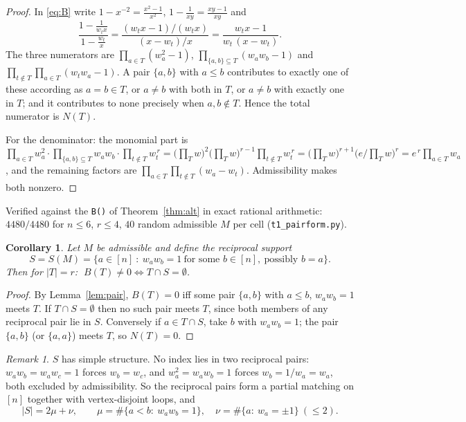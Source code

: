 \documentclass[11pt]{article}
\newtheorem{corollary}[theorem]{Corollary}
\theoremstyle{definition}
\theoremstyle{remark}
\newtheorem{remark}[theorem]{Remark}
\begin{document}
\begin{proof}
In \eqref{eq:B} write $1-x^{-2}=\frac{x^2-1}{x^2}$,
$1-\frac{1}{xy}=\frac{xy-1}{xy}$ and
\[
  \frac{1-\frac{1}{w_tx}}{1-\frac{w_t}{x}}
  =\frac{(w_tx-1)/(w_tx)}{(x-w_t)/x}
  =\frac{w_tx-1}{w_t\,(x-w_t)} .
\]
The three numerators are $\prod_{a\in T}(w_a^2-1)$, $\prod_{\{a,b\}\subseteq T}(w_aw_b-1)$
and $\prod_{t\notin T}\prod_{a\in T}(w_tw_a-1)$. A pair $\{a,b\}$ with $a\le b$
contributes to exactly one of these according as $a=b\in T$, or $a\ne b$ with both
in $T$, or $a\ne b$ with exactly one in $T$; and it contributes to none precisely
when $a,b\notin T$. Hence the total numerator is $N(T)$.

For the denominator: the monomial part is
$\prod_{a\in T}w_a^2\cdot\prod_{\{a,b\}\subseteq T}w_aw_b\cdot
 \prod_{t\notin T}w_t^{\,r}
 =\bigl(\prod_Tw\bigr)^{2}\bigl(\prod_Tw\bigr)^{r-1}\prod_{t\notin T}w_t^{\,r}
 =\bigl(\prod_Tw\bigr)^{r+1}\bigl(e/\!\prod_Tw\bigr)^{r}
 =e^{\,r}\prod_{a\in T}w_a$,
and the remaining factors are $\prod_{a\in T}\prod_{t\notin T}(w_a-w_t)$.
Admissibility makes both nonzero.
\end{proof}

Verified against the \texttt{B()} of Theorem~\ref{thm:alt} in exact rational
arithmetic: $4480/4480$ for $n\le6$, $r\le4$, $40$ random admissible $M$ per cell
(\texttt{t1\_pairform.py}).

\begin{corollary}\label{cor:Bzero}
Let $M$ be admissible and define the \emph{reciprocal support}
\[
  S=S(M)=\{a\in[n]\ :\ w_aw_b=1\ \text{for some }b\in[n],\ \text{possibly }b=a\}.
\]
Then for $|T|=r$: $\;B(T)\ne0\iff T\cap S=\emptyset$.
\end{corollary}

\begin{proof}
By Lemma~\ref{lem:pair}, $B(T)=0$ iff some pair $\{a,b\}$ with $a\le b$,
$w_aw_b=1$ meets $T$. If $T\cap S=\emptyset$ then no such pair meets $T$, since
both members of any reciprocal pair lie in $S$. Conversely if $a\in T\cap S$,
take $b$ with $w_aw_b=1$; the pair $\{a,b\}$ (or $\{a,a\}$) meets $T$, so
$N(T)=0$.
\end{proof}

\begin{remark}\label{rem:matching}
$S$ has simple structure. No index lies in two reciprocal pairs: $w_aw_b=w_aw_c=1$
forces $w_b=w_c$, and $w_a^2=w_aw_b=1$ forces $w_b=1/w_a=w_a$, both excluded by
admissibility. So the reciprocal pairs form a partial matching on $[n]$ together
with vertex-disjoint loops, and
\[
  |S|=2\mu+\nu,\qquad
  \mu=\#\{a<b:\ w_aw_b=1\},\quad \nu=\#\{a:\ w_a=\pm1\}\ (\le 2).
\]
\end{remark}
\end{document}
